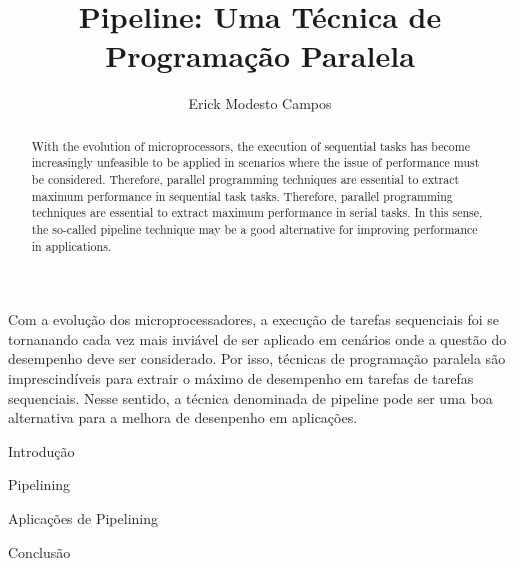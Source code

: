 \documentclass[12pt]{article}
\title{Pipeline: Uma Técnica de Programação Paralela}
\author{Erick Modesto Campos}
\begin{document}
 

\onehalfspace
\maketitle

\begin{abstract}
   With the evolution of microprocessors, the execution of sequential tasks has
   become increasingly unfeasible to be applied in scenarios where the issue of
   performance must be considered. Therefore, parallel programming techniques
   are essential to extract maximum performance in sequential task tasks.
   Therefore, parallel programming techniques are essential to extract maximum
   performance in serial tasks. In this sense, the so-called pipeline technique
   may be a good alternative for improving performance in applications.

\end{abstract}
     
\begin{resumo}
  Com a evolução dos microprocessadores, a execução de tarefas sequenciais foi
  se tornanando cada vez mais inviável de ser aplicado em cenários onde a
  questão do desempenho deve ser considerado. Por isso, técnicas de programação
  paralela são imprescindíveis para extrair o máximo de desempenho em tarefas
  de tarefas sequenciais. Nesse sentido, a técnica denominada de pipeline pode
  ser uma boa alternativa para a melhora de desenpenho em aplicações.
\end{resumo}

\begin{section}{Introdução}

\end{section}
\begin{section}{Pipelining}

\end{section}
\begin{section}{Aplicações de Pipelining}

\end{section}
\begin{section}{Conclusão}

\end{section}
\newpage


\end{document}

